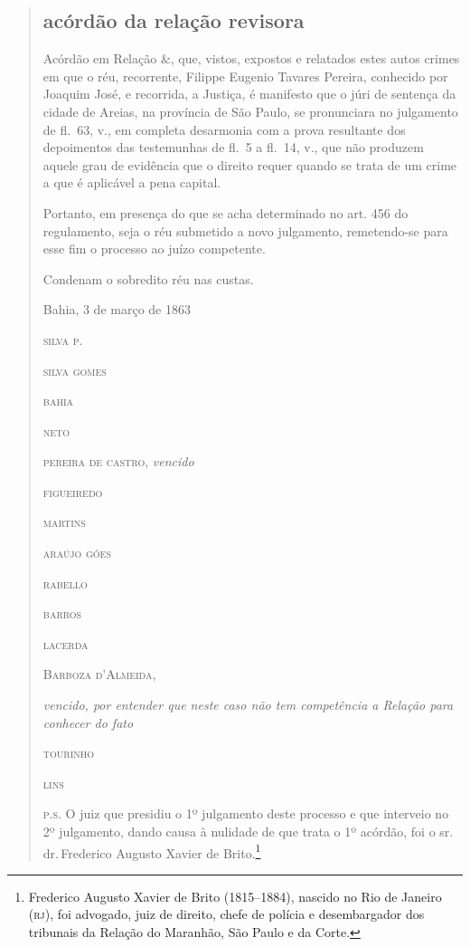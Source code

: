 \begin{quote}
\subsection{acórdão da relação revisora}

Acórdão em Relação \&, que, vistos, expostos e relatados estes autos
crimes em que o réu, recorrente, Filippe Eugenio Tavares Pereira,
conhecido por Joaquim José, e recorrida, a Justiça, é manifesto que o
júri de sentença da cidade de Areias, na província de São Paulo, se
pronunciara no julgamento de fl.~63, v., em completa desarmonia com a
prova resultante dos depoimentos das testemunhas de fl.~5 a fl.~14, v.,
que não produzem aquele grau de evidência que o direito requer quando se
trata de um crime a que é aplicável a pena capital.

Portanto, em presença do que se acha determinado no art. 456 do
regulamento, seja o réu submetido a novo julgamento, remetendo-se para
esse fim o processo ao juízo competente.

Condenam o sobredito réu nas custas.

\begin{flushright}
Bahia, 3 de março de 1863


\textsc{silva p.}

\textsc{silva gomes}

\textsc{bahia}

\textsc{neto}

\textsc{pereira de castro}, \emph{vencido}

\textsc{figueiredo}

\textsc{martins}

\textsc{araújo góes}

\textsc{rabello}

\textsc{barros}

\textsc{lacerda}

\textsc{Barboza d'Almeida}, 

\parbox{170pt}{\emph{vencido, por entender que neste caso
não tem competência a Relação para conhecer do fato}} %

\textsc{tourinho}

\textsc{lins}
\end{flushright}

\textsc{p.s.} O juiz que presidiu o 1º julgamento deste processo e que
interveio no 2º julgamento, dando causa à nulidade de que trata o 1º
acórdão, foi o sr.\,dr.\,Frederico Augusto Xavier de Brito.\footnote{
  Frederico Augusto Xavier de Brito (1815--1884), nascido no Rio de
  Janeiro (\textsc{rj}), foi advogado, juiz de direito, chefe de polícia e
  desembargador dos tribunais da Relação do Maranhão, São Paulo e da
  Corte.}
\end{quote}

